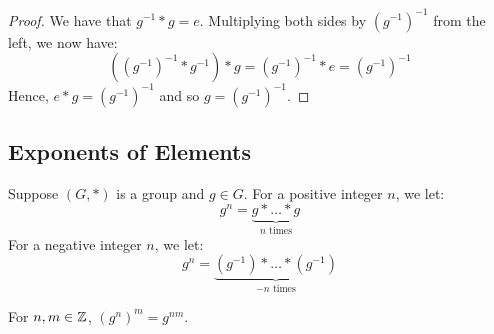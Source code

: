 \documentclass[letterpaper]{article}
\begin{document}
\begin{mdframed}
    \begin{proof}
        We have that $g^{-1} * g = e$. Multiplying both sides by $(g^{-1})^{-1}$ from the left, we now have: 
        \[((g^{-1})^{-1} * g^{-1}) * g = (g^{-1})^{-1} * e = (g^{-1})^{-1}\]
        Hence, $e * g = (g^{-1})^{-1}$ and so $g = (g^{-1})^{-1}$.     
    \end{proof}
\end{mdframed}

\subsection{Exponents of Elements}
Suppose $(G, *)$ is a group and $g \in G$. For a positive integer $n$, we let: 
\[g^n = \underbrace{g * \dots * g}_{n \text{ times}}\]
For a negative integer $n$, we let: 
\[g^n = \underbrace{(g^{-1}) * \dots * (g^{-1})}_{-n \text{ times}}\]

\begin{lemma}{}{}
    For $n, m \in \mathbb{Z}$, $(g^n)^m = g^{nm}$. 
\end{lemma}
\end{document}
